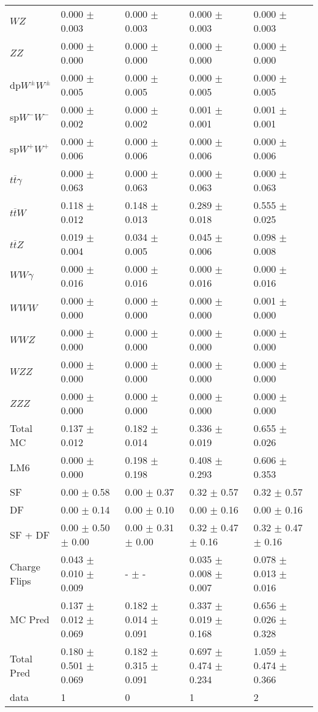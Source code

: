 \begin{tabular}{l | l l l l}
$WZ$ &  0.000 $\pm$  0.003 &  0.000 $\pm$  0.003 &  0.000 $\pm$  0.003 &  0.000 $\pm$  0.003\\
$ZZ$ &  0.000 $\pm$   0.000 &  0.000 $\pm$   0.000 &  0.000 $\pm$   0.000 &  0.000 $\pm$   0.000\\
\hline
dp$W^{\pm}W^{\pm}$ &  0.000 $\pm$  0.005 &  0.000 $\pm$  0.005 &  0.000 $\pm$  0.005 &  0.000 $\pm$  0.005\\
sp$W^{-}W^{-}$ &  0.000 $\pm$  0.002 &  0.000 $\pm$  0.002 &  0.001 $\pm$  0.001 &  0.001 $\pm$  0.001\\
sp$W^{+}W^{+}$ &  0.000 $\pm$  0.006 &  0.000 $\pm$  0.006 &  0.000 $\pm$  0.006 &  0.000 $\pm$  0.006\\
$t\overline{t}\gamma$ &  0.000 $\pm$  0.063 &  0.000 $\pm$  0.063 &  0.000 $\pm$  0.063 &  0.000 $\pm$  0.063\\
$t\overline{t}W$ &  0.118 $\pm$  0.012 &  0.148 $\pm$  0.013 &  0.289 $\pm$  0.018 &  0.555 $\pm$  0.025\\
$t\overline{t}Z$ &  0.019 $\pm$  0.004 &  0.034 $\pm$  0.005 &  0.045 $\pm$  0.006 &  0.098 $\pm$  0.008\\
$WW\gamma$ &  0.000 $\pm$  0.016 &  0.000 $\pm$  0.016 &  0.000 $\pm$  0.016 &  0.000 $\pm$  0.016\\
$WWW$ &   0.000 $\pm$   0.000 &   0.000 $\pm$   0.000 &   0.000 $\pm$   0.000 &  0.001 $\pm$   0.000\\
$WWZ$ &  0.000 $\pm$   0.000 &  0.000 $\pm$   0.000 &  0.000 $\pm$   0.000 &  0.000 $\pm$   0.000\\
$WZZ$ &   0.000 $\pm$   0.000 &  0.000 $\pm$   0.000 &   0.000 $\pm$   0.000 &   0.000 $\pm$   0.000\\
$ZZZ$ &  0.000 $\pm$   0.000 &  0.000 $\pm$   0.000 &   0.000 $\pm$   0.000 &   0.000 $\pm$   0.000\\
\hline
Total MC &  0.137 $\pm$  0.012 &  0.182 $\pm$  0.014 &  0.336 $\pm$  0.019 &  0.655 $\pm$  0.026\\
\hline\hline
\hline
LM6 &  0.000 $\pm$  0.000 &  0.198 $\pm$  0.198 &  0.408 $\pm$  0.293 &  0.606 $\pm$  0.353\\
\hline\hline
\hline\hline
 SF  & 0.00 $\pm$ 0.58 & 0.00 $\pm$ 0.37 & 0.32 $\pm$ 0.57 & 0.32 $\pm$ 0.57\\
 DF  & 0.00 $\pm$ 0.14 & 0.00 $\pm$ 0.10 & 0.00 $\pm$ 0.16 & 0.00 $\pm$ 0.16\\
\hline
 SF + DF  & 0.00 $\pm$ 0.50 $\pm$ 0.00 & 0.00 $\pm$ 0.31 $\pm$ 0.00 & 0.32 $\pm$ 0.47 $\pm$ 0.16 & 0.32 $\pm$ 0.47 $\pm$ 0.16\\
\hline\hline
Charge Flips & 0.043 $\pm$ 0.010 $\pm$ 0.009 & - $\pm$ - & 0.035 $\pm$ 0.008 $\pm$ 0.007 & 0.078 $\pm$ 0.013 $\pm$ 0.016\\
\hline\hline
\hline
MC Pred &  0.137 $\pm$  0.012 $\pm$  0.069 &  0.182 $\pm$  0.014 $\pm$  0.091 &  0.337 $\pm$  0.019 $\pm$  0.168 &  0.656 $\pm$  0.026 $\pm$  0.328\\
\hline\hline
Total Pred &  0.180 $\pm$  0.501 $\pm$  0.069 &  0.182 $\pm$  0.315 $\pm$  0.091 &  0.697 $\pm$  0.474 $\pm$  0.234 &  1.059 $\pm$  0.474 $\pm$  0.366\\
\hline\hline
data & 1 & 0 & 1 & 2\\
\hline\hline
\end{tabular}
